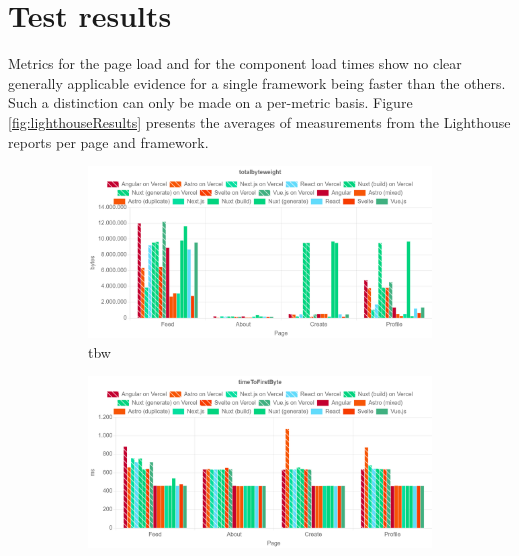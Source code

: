 \documentclass[a4paper, 12pt]{article}
\begin{document}
\section{Test results}

Metrics for the page load and for the component load times show no clear generally applicable evidence for a single framework being faster than the others.
Such a distinction can only be made on a per-metric basis.
Figure \ref{fig:lighthouseResults} presents the averages of measurements from the Lighthouse reports per page and framework.

\begin{figure}[!h]
  \centering
  \begin{subfigure}{0.49\linewidth}
    \begin{center}
      \includegraphics[width=\linewidth, keepaspectratio]{img/lighthouse-results/TBW.png}
    \end{center}
    \caption{\acrfull{tbw}}\label{subfig:LH:totalbyteweight}
  \end{subfigure}
  \begin{subfigure}{0.49\linewidth}
    \begin{center}
      \includegraphics[width=\linewidth, keepaspectratio]{img/lighthouse-results/TTFB.png}

\end{center}
\end{subfigure}
\end{figure}
\end{document}
